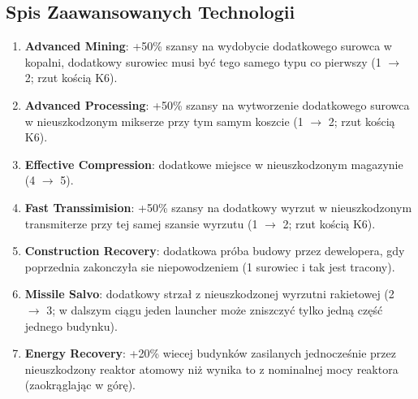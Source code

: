\documentclass[11pt,a4paper]{article}
\begin{document}
\subsection{Spis Zaawansowanych Technologii}
\begin{enumerate}
\item \textbf{Advanced Mining}: +50\% szansy na wydobycie dodatkowego surowca w kopalni, dodatkowy surowiec musi być tego samego typu co pierwszy (1 $\to$ 2; rzut kością K6).
\item \textbf{Advanced Processing}: +50\% szansy na wytworzenie dodatkowego surowca w nieuszkodzonym mikserze przy tym samym koszcie (1 $\to$ 2; rzut kością K6).
\item \textbf{Effective Compression}: dodatkowe miejsce w nieuszkodzonym magazynie (4 $\to$ 5).
\item \textbf{Fast Transsimision}: +50\% szansy na dodatkowy wyrzut w nieuszkodzonym transmiterze przy tej samej szansie wyrzutu (1 $\to$ 2; rzut kością K6).
\item \textbf{Construction Recovery}: dodatkowa próba budowy przez dewelopera, gdy poprzednia zakonczyła sie niepowodzeniem (1 surowiec i tak jest tracony).
\item \textbf{Missile Salvo}: dodatkowy strzał z nieuszkodzonej wyrzutni rakietowej (2 $\to$ 3; w dalszym ciągu jeden launcher może zniszczyć tylko jedną część jednego budynku).
\item \textbf{Energy Recovery}: +20\% wiecej budynków zasilanych jednocześnie przez nieuszkodzony reaktor atomowy niż wynika to z nominalnej mocy reaktora (zaokrąglając w górę).
\end{enumerate}
\end{document}

